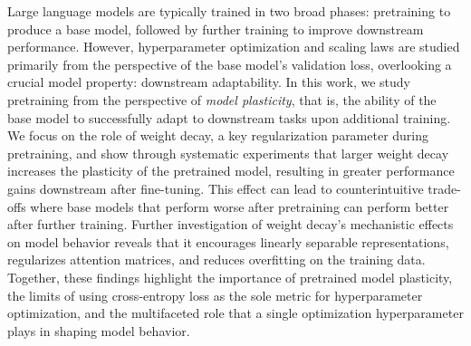 


Large language models are typically trained in two broad phases: pretraining to produce a base model, followed by further training to improve downstream performance. However, hyperparameter optimization and scaling laws are studied primarily from the perspective of the base model's validation loss, overlooking a crucial model property: downstream adaptability. In this work, we study pretraining from the perspective of {\it model plasticity}, that is, the ability of the base model to successfully adapt to downstream tasks upon additional training. We focus on the role of weight decay, a key regularization parameter during pretraining, and show through systematic experiments that larger weight decay increases the plasticity of the pretrained model, resulting in greater performance gains downstream after fine-tuning. This effect can lead to counterintuitive trade-offs where base models that perform worse after pretraining can perform better after further training. Further investigation of weight decay's mechanistic effects on model behavior reveals that it encourages linearly separable representations, regularizes attention matrices, and reduces overfitting on the training data. Together, these findings highlight the importance of pretrained model plasticity, the limits of using cross-entropy loss as the sole metric for hyperparameter optimization, and the multifaceted role that a single optimization hyperparameter plays in shaping model behavior.

